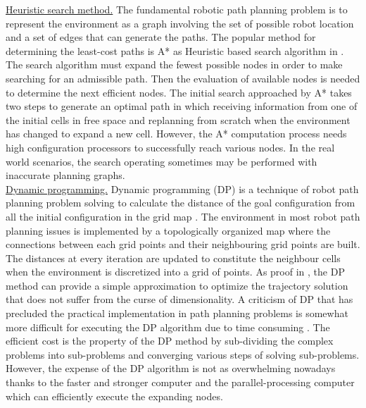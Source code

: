 \noindent\uline{Heuristic search method.} 
The fundamental robotic path planning problem is to represent the environment as a graph involving the set of possible robot location and a set of edges that can generate the paths. The popular method for determining the least-cost paths is A* as Heuristic based search algorithm in  \cite{Hart68_HeuristicDetermination,
Nilsson82_Principles_AI, 
Rankin_1996_A_star_Search}.
The search algorithm must expand the fewest possible nodes in order to make searching for an admissible path. Then the evaluation of available nodes is needed to determine the next efficient nodes.
The initial search approached by A* takes two steps to generate an optimal path in which receiving information from one of the initial cells in free space and replanning from scratch when the environment has changed to expand a new cell.
However, the A* computation process needs high configuration processors to successfully reach various nodes. In the real world scenarios, the search operating sometimes may be performed with inaccurate planning graphs.\\

\noindent\uline{Dynamic programming.}
Dynamic programming (DP) is a technique of robot path planning problem solving to calculate the distance of the goal configuration from all the initial configuration in the grid map \cite{Bellman57_DynamicProgramming}. 
The environment in most robot path planning issues is implemented by a topologically organized map where the connections between each grid points and their neighbouring grid points are built. The distances at every iteration are updated to constitute the neighbour cells when the environment is discretized into a grid of points. 
As proof in \cite{Bellman57_DynamicProgramming}, the DP method can provide a simple approximation to optimize the trajectory solution that does not suffer from the curse of dimensionality. 
A criticism of DP that has precluded the practical implementation in path planning problems is somewhat more difficult for executing the DP algorithm due to time consuming \cite{Kala12_RobotPP_DynamicPlanning}.
The efficient cost is the property of the DP method by sub-dividing the complex problems into sub-problems and converging various steps of solving sub-problems. However, the expense of the DP algorithm is not as overwhelming nowadays thanks to the faster and stronger computer and the parallel-processing computer which can efficiently execute the expanding nodes.  \\

